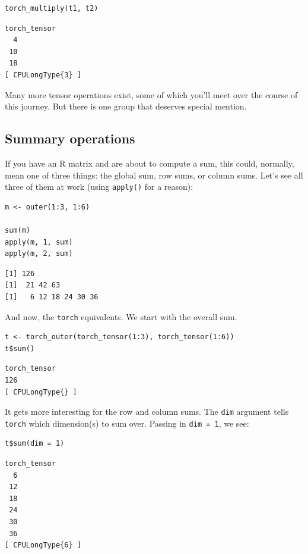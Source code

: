 \documentclass[
  letterpaper,
]{krantz}
\begin{document}
\begin{verbatim}
torch_multiply(t1, t2)
\end{verbatim}

\begin{verbatim}
torch_tensor
  4
 10
 18
[ CPULongType{3} ]
\end{verbatim}

Many more tensor operations exist, some of which you'll meet over the
course of this journey. But there is one group that deserves special
mention.

\hypertarget{summary-operations}{%
\subsection{Summary operations}\label{summary-operations}}

If you have an R matrix and are about to compute a sum, this could,
normally, mean one of three things: the global sum, row sums, or column
sums. Let's see all three of them at work (using \texttt{apply()} for a
reason):

\begin{verbatim}
m <- outer(1:3, 1:6)

sum(m)
apply(m, 1, sum)
apply(m, 2, sum)
\end{verbatim}

\begin{verbatim}
[1] 126
[1]  21 42 63
[1]   6 12 18 24 30 36
\end{verbatim}

And now, the \texttt{torch} equivalents. We start with the overall sum.

\begin{verbatim}
t <- torch_outer(torch_tensor(1:3), torch_tensor(1:6))
t$sum()
\end{verbatim}

\begin{verbatim}
torch_tensor
126
[ CPULongType{} ]
\end{verbatim}

It gets more interesting for the row and column sums. The \texttt{dim}
argument tells \texttt{torch} which dimension(s) to sum over. Passing in
\texttt{dim\ =\ 1}, we see:

\begin{verbatim}
t$sum(dim = 1)
\end{verbatim}

\begin{verbatim}
torch_tensor
  6
 12
 18
 24
 30
 36
[ CPULongType{6} ]
\end{verbatim}
\end{document}
